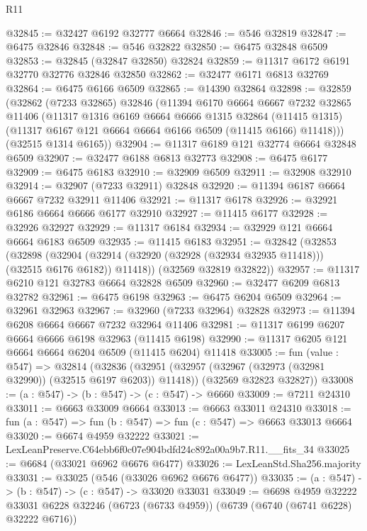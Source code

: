 \begin{lexlean}{R11}
\begin{coremodule}
@32845 := @32427 @6192 @32777 @6664
@32846 := @546 @32819
@32847 := @6475 @32846
@32848 := @546 @32822
@32850 := @6475 @32848 @6509
@32853 := @32845 (@32847 @32850) @32824
@32859 := @11317 @6172 @6191 @32770 @32776 @32846 @32850
@32862 := @32477 @6171 @6813 @32769
@32864 := @6475 @6166 @6509
@32865 := @14390 @32864
@32898 := @32859
    (@32862
      (@7233 @32865)
      @32846
      (@11394
        @6170
        @6664
        @6667
        @7232
        @32865
        @11406
        (@11317
          @1316
          @6169
          @6664
          @6666
          @1315
          @32864
          (@11415 @1315)
          (@11317 @6167 @121 @6664 @6664 @6166 @6509 (@11415 @6166) @11418)))
      (@32515 @1314 @6165))
@32904 := @11317 @6189 @121 @32774 @6664 @32848 @6509
@32907 := @32477 @6188 @6813 @32773
@32908 := @6475 @6177
@32909 := @6475 @6183
@32910 := @32909 @6509
@32911 := @32908 @32910
@32914 := @32907 (@7233 @32911) @32848
@32920 := @11394 @6187 @6664 @6667 @7232 @32911 @11406
@32921 := @11317 @6178
@32926 := @32921 @6186 @6664 @6666 @6177 @32910
@32927 := @11415 @6177
@32928 := @32926 @32927
@32929 := @11317 @6184
@32934 := @32929 @121 @6664 @6664 @6183 @6509
@32935 := @11415 @6183
@32951 := @32842
    (@32853
      (@32898
        (@32904 (@32914 (@32920 (@32928 (@32934 @32935 @11418))) (@32515 @6176 @6182)) @11418))
      (@32569 @32819 @32822))
@32957 := @11317 @6210 @121 @32783 @6664 @32828 @6509
@32960 := @32477 @6209 @6813 @32782
@32961 := @6475 @6198
@32963 := @6475 @6204 @6509
@32964 := @32961 @32963
@32967 := @32960 (@7233 @32964) @32828
@32973 := @11394 @6208 @6664 @6667 @7232 @32964 @11406
@32981 := @11317 @6199 @6207 @6664 @6666 @6198 @32963 (@11415 @6198)
@32990 := @11317 @6205 @121 @6664 @6664 @6204 @6509 (@11415 @6204) @11418
@33005 := fun (value : @547) =>
  @32814
    (@32836
      (@32951 (@32957 (@32967 (@32973 (@32981 @32990)) (@32515 @6197 @6203)) @11418))
      (@32569 @32823 @32827))
@33008 := (a : @547) -> (b : @547) -> (c : @547) -> @6660
@33009 := @7211 @24310
@33011 := @6663 @33009 @6664
@33013 := @6663 @33011 @24310
@33018 := fun (a : @547) => fun (b : @547) => fun (c : @547) => @6663 @33013 @6664
@33020 := @6674 @4959 @32222
@33021 := LexLeanPreserve.C64ebb6f0c07e904bdfd24c892a00a9b7.R11.__fits_34
@33025 := @6684 (@33021 @6962 @6676 @6477)
@33026 := LexLeanStd.Sha256.majority
@33031 := @33025 (@546 (@33026 @6962 @6676 @6477))
@33035 := (a : @547) -> (b : @547) -> (c : @547) -> @33020 @33031
@33049 := @6698
    @4959
    @32222
    @33031
    @6228
    @32246
    (@6723 (@6733 @4959))
    (@6739 (@6740 (@6741 @6228) @32222 @6716))

\end{coremodule}
\end{lexlean}
